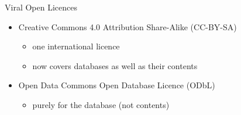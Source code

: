 \documentclass{beamer}
\begin{document}
\begin{frame}{Viral Open Licences}
  \begin{itemize}
  \item Creative Commons 4.0 Attribution Share-Alike (CC-BY-SA)
    \begin{itemize}
    \item one international licence
    \item now covers databases as well as their contents
    \end{itemize}
  \item Open Data Commons Open Database Licence (ODbL)
    \begin{itemize}
    \item purely for the database (not contents)
    \end{itemize}
  \end{itemize}
\end{frame}
\end{document}

